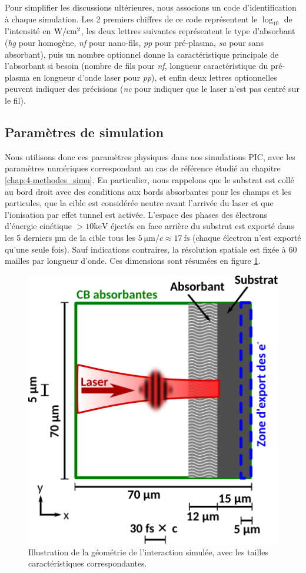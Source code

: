 \begin{refsection}
Pour simplifier les discussions ultérieures, nous associons un code d'identification à chaque simulation. Les 2 premiers chiffres de ce code représentent le $\log_{10}$ de l'intensité en $\rm W/cm^2$, les deux lettres suivantes représentent le type d'absorbant (\textit{hg} pour homogène, \textit{nf} pour nano-fils, \textit{pp} pour pré-plasma, \textit{sa} pour sans absorbant), puis un nombre optionnel donne la caractéristique principale de l'absorbant si besoin (nombre de fils pour \textit{nf}, longueur caractéristique du pré-plasma en longueur d'onde laser pour \textit{pp}), et enfin deux lettres optionnelles peuvent indiquer des précisions (\textit{nc} pour indiquer que le laser n'est pas centré sur le fil).

\subsection{Paramètres de simulation}

Nous utilisons donc ces paramètres physiques dans nos simulations PIC, avec les paramètres numériques correspondant au cas de référence étudié au chapitre \ref{chap:4-methodes_simu}. En particulier, nous rappelons que le substrat est collé au bord droit avec des conditions aux bords absorbantes pour les champs et les particules, que la cible est considérée neutre avant l'arrivée du laser et que l'ionisation par effet tunnel est activée. L'espace des phases des électrons d'énergie cinétique $> 10 \si{\keV}$ éjectés en face arrière du substrat est exporté dans les 5 derniers µm de la cible tous les $5 ~ \si{\um/c} \approx 17 ~ \si{\fs}$ (chaque électron n'est exporté qu'une seule fois). Sauf indications contraires, la résolution spatiale est fixée à 60 mailles par longueur d'onde. Ces dimensions sont résumées en figure \ref{fig:62-dimensions_simu}.

\begin{figure}[hbtp]
	\centering
	\includegraphics[width=0.5\linewidth]{6-opti_numerique/boite_simu.png}
    \caption{Illustration de la géométrie de l'interaction simulée, avec les tailles caractéristiques correspondantes.}
	\label{fig:62-dimensions_simu}
\end{figure}


\end{refsection}
